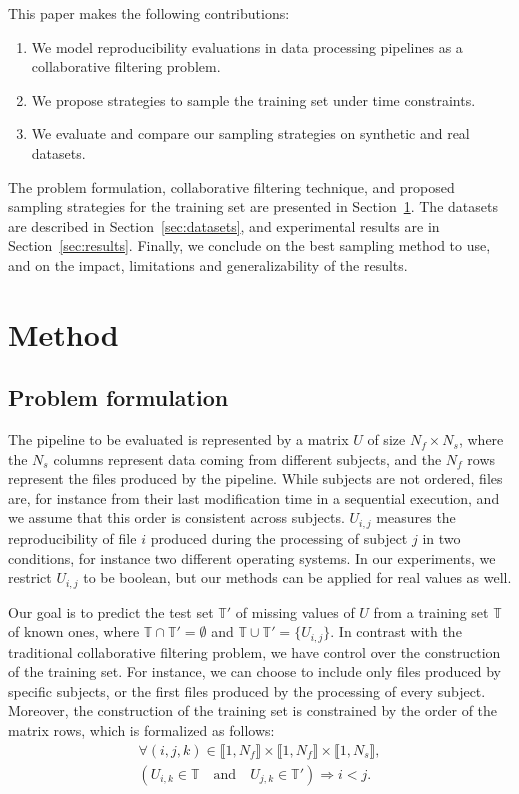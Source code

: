 \documentclass[10pt, conference, compsocconf]{IEEEtran}
\begin{document}
This paper makes the following contributions:
\begin{enumerate}
\item We model reproducibility evaluations in data processing pipelines as a collaborative filtering problem.
\item We propose strategies to sample the training set under time constraints.
\item We evaluate and compare our sampling strategies on synthetic and real datasets.
\end{enumerate}
The problem formulation, collaborative filtering technique, and 
proposed sampling strategies for the training set are presented in 
Section~\ref{sec:methods}. The datasets are described in 
Section~\ref{sec:datasets}, and experimental results are in 
Section~\ref{sec:results}.
Finally, we conclude on the best sampling method to use, and on the 
impact, limitations and generalizability of the results.

\section{Method}
\label{sec:methods}
\subsection{Problem formulation}

The pipeline to be evaluated is represented by a matrix $U$ of size 
$N_f \times N_s$, where the $N_s$ columns represent data coming from 
different subjects, and the $N_f$ rows represent the files produced by 
the pipeline. While subjects are not ordered, files are, for 
instance from their last modification time in a sequential execution, 
and we assume that this order is consistent across subjects. $U_{i, j}$ 
measures the reproducibility of file $i$ produced during the processing 
of subject $j$ in two conditions, for instance two different 
operating systems. In our experiments, we restrict $U_{i,j}$ to be 
boolean, but our methods can be applied for real values as well. 

Our goal is to predict the test set $\mathbb{T'}$ of missing values of 
$U$ from a training set $\mathbb{T}$ of known ones, where $\mathbb{T} 
\cap \mathbb{T'} = \emptyset$ and $\mathbb{T} \cup \mathbb{T'} = 
\{U_{i,j}\}$. In contrast with the traditional collaborative filtering 
problem, we have control over the construction of the training set. 
For instance, we can choose to include only files produced by specific 
subjects, or the first files produced by the processing of every 
subject. Moreover, the construction of the training set is constrained by 
the 
order of the matrix rows, which is formalized as follows: 
\begin{equation}
\begin{array}{l}
\forall (i, j, k) \in \llbracket 1, N_f \rrbracket \times \llbracket 1, N_f \rrbracket \times \llbracket 1, N_s \rrbracket, \\
 \left( U_{i,k} \in \mathbb{T} \quad \mathrm{and} \quad U_{j,k} \in \mathbb{T'} \right) \Rightarrow i < j. \label{eq:time}
 \end{array}
\end{equation}
\end{document}
